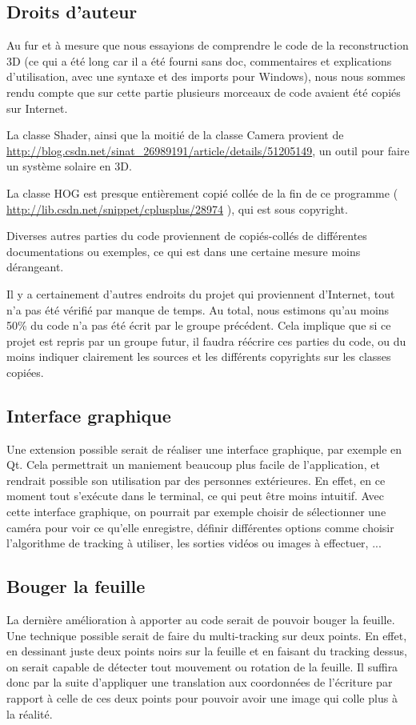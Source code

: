 \subsection{Droits d'auteur}
Au fur et à mesure que nous essayions de comprendre le code de la reconstruction 3D (ce qui a été long car il a été fourni sans doc, commentaires et explications d'utilisation, avec une syntaxe et des imports pour Windows), nous nous sommes rendu compte que sur cette partie plusieurs morceaux de code avaient été copiés sur Internet.

La classe Shader, ainsi que la moitié de la classe Camera provient de \url{http://blog.csdn.net/sinat_26989191/article/details/51205149}, un outil pour faire un système solaire en 3D.

La classe HOG est presque entièrement copié collée de la fin de ce programme ( \url{http://lib.csdn.net/snippet/cplusplus/28974} ), qui est sous copyright.

Diverses autres parties du code proviennent de copiés-collés de différentes documentations ou exemples, ce qui est dans une certaine mesure moins dé\-ran\-geant.

Il y a certainement d'autres endroits du projet qui proviennent d'Internet, tout n'a pas été vérifié par manque de temps. Au total, nous estimons qu'au moins 50\% du code n'a pas été écrit par le groupe précédent. Cela implique que si ce projet est repris par un groupe futur, il faudra réécrire ces parties du code, ou du moins indiquer clairement les sources et les différents copyrights sur les classes copiées.

\subsection{Interface graphique}

Une extension possible serait de réaliser une interface graphique, par exemple en Qt. Cela permettrait un maniement beaucoup plus facile de l'application, et rendrait possible son utilisation par des personnes extérieures. En effet, en ce moment tout s'exécute dans le terminal, ce qui peut être moins intuitif. Avec cette interface graphique, on pourrait par exemple choisir de sélectionner une caméra pour voir ce qu'elle enregistre, définir différentes options comme choisir l'algorithme de tracking à utiliser, les sorties vidéos ou images à effectuer, ...

\subsection{Bouger la feuille}

La dernière amélioration à apporter au code serait de pouvoir bouger la feuille. Une technique possible serait de faire du multi-tracking sur deux points. En effet, en dessinant juste deux points noirs sur la feuille et en faisant du tracking dessus, on serait capable de détecter tout mouvement ou rotation de la feuille. Il suffira donc par la suite d'appliquer une translation aux coordonnées de l'écriture par rapport à celle de ces deux points pour pouvoir avoir une image qui colle plus à la réalité.